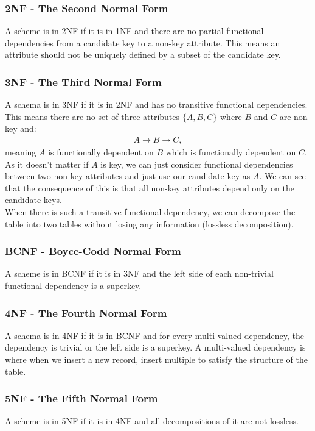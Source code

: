 \subsubsection{2NF - The Second Normal Form}

A scheme is in 2NF if it is in 1NF and there are no partial functional
dependencies from a candidate key to a non-key attribute. This means
an attribute should not be uniquely defined by a subset of the candidate key.

\subsubsection{3NF - The Third Normal Form}

A schema is in 3NF if it is in 2NF and has no transitive functional dependencies.
This means there are no set of three attributes $\{A, B, C\}$ where $B$ and $C$
are non-key and: \begin{gather*}
    A \rightarrow B \rightarrow C,
\end{gather*} meaning $A$ is functionally dependent on $B$ which is functionally 
dependent on $C$. As it doesn't matter if $A$ is key, we can just consider functional
dependencies between two non-key attributes and just use our candidate key as $A$.
We can see that the consequence of this is that all non-key attributes depend only on
the candidate keys.
\\[\baselineskip]
When there is such a transitive functional dependency, we can decompose the table
into two tables without losing any information (lossless decomposition).

\subsubsection{BCNF - Boyce-Codd Normal Form}

A scheme is in BCNF if it is in 3NF and the left side of each non-trivial
functional dependency is a superkey.

\subsubsection{4NF - The Fourth Normal Form}

A schema is in 4NF if it is in BCNF and for every multi-valued dependency, 
the dependency is trivial or the left side is a superkey. A multi-valued dependency
is where when we insert a new record, insert multiple to satisfy the structure of the
table.

\subsubsection{5NF - The Fifth Normal Form}

A scheme is in 5NF if it is in 4NF and all decompositions of it are not lossless.


